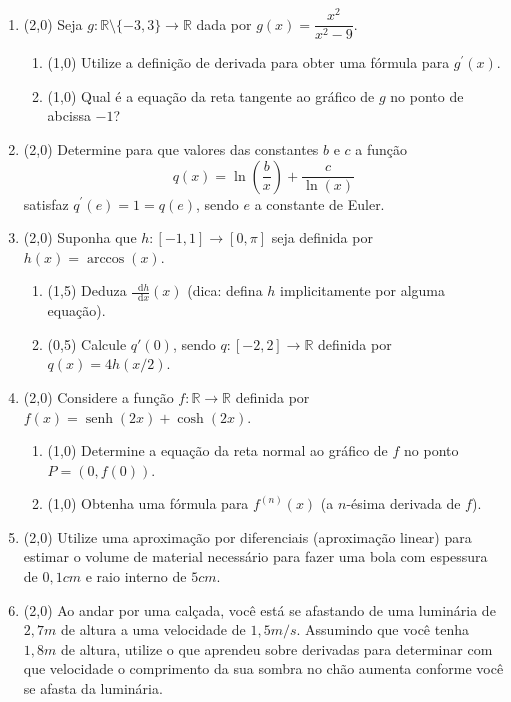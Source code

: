 \documentclass[12pt,a4paper]{article}
\newcommand*\diff{\mathop{}\!\mathrm{d}}
\newcommand*\senh{\operatorname{senh}}
\newcommand*\R{\mathbb{R}}
\begin{document}
\begin{enumerate}
\item (2,0) Seja $g: \R \setminus \{-3, 3\} \to \R$ dada por $g(x) = \dfrac{x^2}{x^2-9}$.
\begin{enumerate}
\item (1,0) Utilize a definição de derivada para obter uma fórmula para $g^\prime(x)$.
\item (1,0) Qual é a equação da reta tangente ao gráfico de $g$ no ponto de abcissa $-1$?
\end{enumerate}

\item (2,0) Determine para que valores das constantes $b$ e $c$ a função
\[ q(x) = \ln\left(\frac{b}{x}\right) + \frac{c}{\ln(x)}\]
satisfaz $q^\prime(e) = 1 = q(e)$, sendo $e$ a constante de Euler.


\item (2,0) Suponha que $h: [-1,1] \to [0, \pi]$ seja definida por $h(x) = \arccos(x)$.
\begin{enumerate}
\item (1,5) Deduza $\frac{ \diff{h} }{\diff{x} }(x)$ (dica: defina $h$ implicitamente por alguma equação).
\item (0,5) Calcule $q'(0)$, sendo $q:[-2,2] \to \mathbb{R}$ definida por $q(x) = 4h(x/2)$.
\end{enumerate}



\item (2,0) Considere a função $f: \R \to \R$ definida por $f(x) = \senh(2x) + \cosh(2x)$.
\begin{enumerate}
\item (1,0) Determine a equação da reta normal ao gráfico de $f$ no ponto $P = (0, f(0))$.
\item (1,0) Obtenha uma fórmula para $f^{(n)}(x)$ (a $n$-ésima derivada de $f$).
\end{enumerate}

\item (2,0) Utilize uma aproximação por diferenciais (aproximação linear) para estimar o volume de material necessário para fazer uma bola com espessura de $0,1 cm$ e raio interno de $5 cm$.

\item (2,0) Ao andar por uma calçada, você está se afastando de uma luminária de $2,7m$ de altura a uma velocidade de $1,5 m/s$. Assumindo que você tenha $1,8m$ de altura, utilize o que aprendeu sobre derivadas para determinar com que velocidade o comprimento da sua sombra no chão aumenta conforme você se afasta da luminária.
\end{enumerate}
\end{document}
